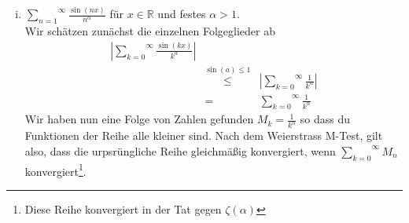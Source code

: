 \documentclass[11pt,a4paper,ngerman]{article}
\begin{document}
\begin{enumerate}[(i)]

    \item $\overset{\infty}{\underset{n=1}{\sum}} \frac{\sin(nx)}{n^\alpha}$ für $x\in\mathbb{R}$ und festes $\alpha > 1$.\\
        Wir schätzen zunächst die einzelnen Folgeglieder ab
        $$\begin{array}{rcl}
            \left| \overset{\infty}{\underset{k=0}{\sum}} \frac{\sin(kx)}{k^\alpha}\right| \\
                &\stackrel{\sin(a)\leq1}{\leq}&  
                    \left| \overset{\infty}{\underset{k=0}{\sum}} \frac{1}{k^\alpha}\right| \\
                &=& \overset{\infty}{\underset{k=0}{\sum}} \frac{1}{k^\alpha} 
        \end{array}$$
        Wir haben nun eine Folge von Zahlen gefunden $M_k = \frac{1}{k^\alpha}$ so dass
        du Funktionen der Reihe alle kleiner sind. Nach dem Weierstrass M-Test, gilt
        also, dass die urpsrüngliche Reihe gleichmäßig konvergiert, wenn 
        $\overset{\infty}{\underset{k=0}{\sum}} M_n$ konvergiert\footnote{Diese Reihe 
        konvergiert in der Tat gegen $\zeta(\alpha)$}.


\end{enumerate}
\end{document}
